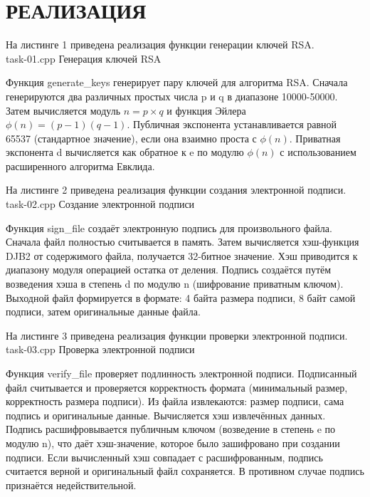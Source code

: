 \chapter*{РЕАЛИЗАЦИЯ}

На листинге 1 приведена реализация функции генерации ключей RSA.\\
    {task-01.cpp}
    {}
    {Генерация ключей RSA}

Функция generate\_keys генерирует пару ключей для алгоритма RSA. Сначала генерируются два различных простых числа p и q в диапазоне 10000-50000. Затем вычисляется модуль $n = p \times q$ и функция Эйлера $\phi(n) = (p-1)(q-1)$. Публичная экспонента устанавливается равной 65537 (стандартное значение), если она взаимно проста с $\phi(n)$. Приватная экспонента d вычисляется как обратное к e по модулю $\phi(n)$ с использованием расширенного алгоритма Евклида.

На листинге 2 приведена реализация функции создания электронной подписи.\\
    {task-02.cpp}
    {}
    {Создание электронной подписи}

Функция sign\_file создаёт электронную подпись для произвольного файла. Сначала файл полностью считывается в память. Затем вычисляется хэш-функция DJB2 от содержимого файла, получается 32-битное значение. Хэш приводится к диапазону модуля операцией остатка от деления. Подпись создаётся путём возведения хэша в степень d по модулю n (шифрование приватным ключом). Выходной файл формируется в формате: 4 байта размера подписи, 8 байт самой подписи, затем оригинальные данные файла.

На листинге 3 приведена реализация функции проверки электронной подписи.\\
    {task-03.cpp}
    {}
    {Проверка электронной подписи}

Функция verify\_file проверяет подлинность электронной подписи. Подписанный файл считывается и проверяется корректность формата (минимальный размер, корректность размера подписи). Из файла извлекаются: размер подписи, сама подпись и оригинальные данные. Вычисляется хэш извлечённых данных. Подпись расшифровывается публичным ключом (возведение в степень e по модулю n), что даёт хэш-значение, которое было зашифровано при создании подписи. Если вычисленный хэш совпадает с расшифрованным, подпись считается верной и оригинальный файл сохраняется. В противном случае подпись признаётся недействительной.

